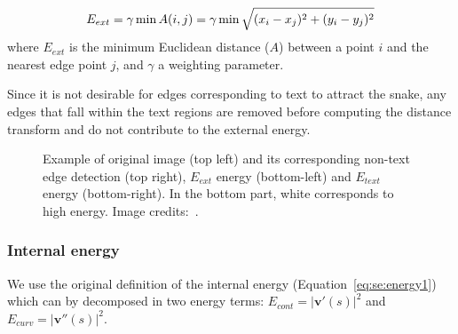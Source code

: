 \begin{equation}\label{eq:se:energy3}
  E_{ext} = \gamma \min A(i,j) = \gamma \min  \sqrt{(x_i-x_j)^2+(y_i-y_j)^2}\\
\end{equation}
where $E_{ext}$ is the minimum Euclidean distance ($A$) between a point $i$ and the nearest edge point $j$, and $\gamma$ a weighting parameter.

Since it is not desirable for edges corresponding to text to attract the snake, any edges that fall within the text regions are removed before computing the distance transform and do not contribute to the external energy.
	
	\begin{figure}[!ht]	%
	  \centering
		\caption[Active contour energies for open balloon extraction]{Example of original image (top left) and its corresponding non-text edge detection (top right), $E_{ext}$ energy (bottom-left) and $E_{text}$ energy (bottom-right). In the bottom part, white corresponds to high energy. Image credits:~\cite{Bubble09}. }
		\label{fig:se:distance_transform}
	\end{figure}

\subsubsection{Internal energy}
We use the original definition of the internal energy (Equation~\ref{eq:se:energy1}) which can by decomposed in two energy terms: $E_{cont} = \left|\mathbf{v}'(s) \right|^2$ and $E_{curv}=\left| \mathbf{v}''(s) \right|^2$.
% 

